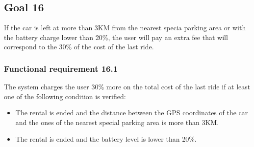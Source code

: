 \subsection{Goal 16}
If the car is left at more than 3KM from the nearest specia parking area or with the battery charge lower than 20\%, the user will pay an extra fee that will correspond to the 30\% of the cost of the last ride.

\setcounter{secnumdepth}{3}
\subsubsection{Functional requirement 16.1}
The system charges the user 30\% more on the total cost of the last ride if at least one of the following condition is verified:
\begin{itemize}
	\item The rental is ended and the distance between the GPS coordinates of the car and the ones of the nearest special parking area is more than 3KM.
	\item The rental is ended and the battery level is lower than 20\%.
\end{itemize}
